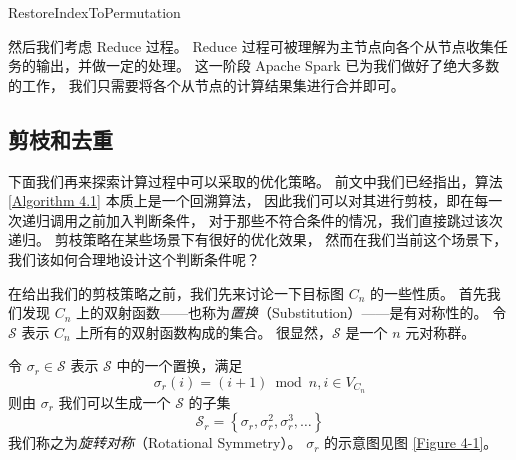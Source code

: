 \begin{algorithm}[h!]
\caption{RestoreIndexToPermutation}
\label{Algorithm 4.6}
\begin{algorithmic}[1]
	 
	 
	 

		 
	\EndFor
	\EndFor
\end{algorithmic}
\end{algorithm}

然后我们考虑 Reduce 过程。
Reduce 过程可被理解为主节点向各个从节点收集任务的输出，并做一定的处理。
这一阶段 Apache Spark 已为我们做好了绝大多数的工作，
我们只需要将各个从节点的计算结果集进行合并即可。

\subsection{剪枝和去重}
\label{Subsection 4.3.2}

下面我们再来探索计算过程中可以采取的优化策略。
前文中我们已经指出，算法 \ref{Algorithm 4.1} 本质上是一个回溯算法，
因此我们可以对其进行剪枝，即在每一次递归调用之前加入判断条件，
对于那些不符合条件的情况，我们直接跳过该次递归。
剪枝策略在某些场景下有很好的优化效果，
然而在我们当前这个场景下，我们该如何合理地设计这个判断条件呢？

在给出我们的剪枝策略之前，我们先来讨论一下目标图 $C_n$ 的一些性质。
首先我们发现 $C_n$ 上的双射函数——也称为\emph{置换}（Substitution）——是有对称性的。
令 $\mathcal{S}$ 表示 $C_n$ 上所有的双射函数构成的集合。
很显然，$\mathcal{S}$ 是一个 $n$ 元对称群。

令 $\sigma_r \in \mathcal{S}$ 表示 $\mathcal{S}$ 中的一个置换，满足
\begin{equation*}
\sigma_r(i) = (i + 1) \bmod n, i \in V_{C_n}
\end{equation*}
则由 $\sigma_r$ 我们可以生成一个 $\mathcal{S}$ 的子集
\begin{equation*}
\mathcal{S}_r = \left\{\sigma_r, \sigma_r^2, \sigma_r^3, \dots\right\}
\end{equation*}
我们称之为\emph{旋转对称}（Rotational Symmetry）。
$\sigma_r$ 的示意图见图 \ref{Figure 4-1}。

